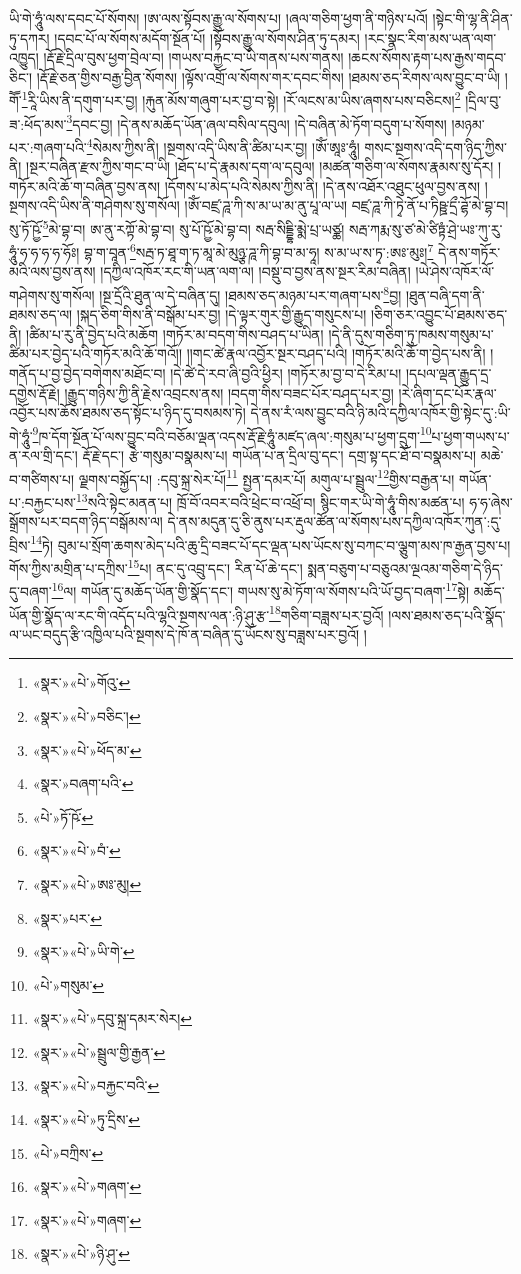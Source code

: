 ཡི་གེ་ཧཱུཾ་ལས་དབང་པོ་སོགས། །ཨ་ལས་སྟོབས་རྒྱུ་ལ་སོགས་པ། །ཞལ་གཅིག་ཕྱག་ནི་གཉིས་པའོ། །སྟེང་གི་ལྷ་ནི་ཤིན་ཏུ་དཀར། །དབང་པོ་ལ་སོགས་མདོག་སྔོན་པོ། །སྟོབས་རྒྱུ་ལ་སོགས་ཤིན་ཏུ་དམར། །རང་སྣང་རིག་མས་ཡན་ལག་འཁྱུད། །རྡོ་རྗེ་དྲིལ་བུས་ཕྱག་བྲེལ་བ། །གཡས་བརྐྱང་བ་ཡི་གནས་པས་གནས། །ཆངས་སོགས་རྟག་པས་རྒྱས་གདབ་ཅིང་། །རྡོ་རྗེ་ཅན་གྱིས་བརྒྱ་བྱིན་སོགས། །ལྟོས་འགྲོ་ལ་སོགས་གར་དབང་གིས། །ཐམས་ཅད་རིགས་ལས་བྱུང་བ་ཡི། །གཽ་\footnote{«སྣར་»«པེ་»གོའུ་}རཱི་ཡིས་ནི་དགུག་པར་བྱ། །རྐུན་མོས་གཞུག་པར་བྱ་བ་སྟེ། །རོ་ལངས་མ་ཡིས་ཞགས་པས་བཅིངས།\footnote{«སྣར་»«པེ་»བཅིང་།} །དྲིལ་བུ་ཟ་:ཕོད་མས་\footnote{«སྣར་»«པེ་»ཕོད་མ་}དབང་བྱ། །དེ་ནས་མཆོད་ཡོན་ཞལ་བསིལ་དབུལ། །དེ་བཞིན་མེ་ཏོག་བདུག་པ་སོགས། །མཉམ་པར་:གཞག་པའི་\footnote{«སྣར་»བཞག་པའི་}སེམས་ཀྱིས་ནི། །སྔགས་འདི་ཡིས་ནི་ཚིམ་པར་བྱ། །ཨོཾ་ཨཱཿ་ཧཱུཾ། གསང་སྔགས་འདི་དག་ཉིད་ཀྱིས་ནི། །སྔར་བཞིན་རྫས་ཀྱིས་གང་བ་ཡི། །ཐོད་པ་དེ་རྣམས་དག་ལ་དབུལ། །མཚན་གཅིག་ལ་སོགས་རྣམས་སུ་དོར། །གཏོར་མའི་ཆོ་ག་བཞིན་བྱས་ནས། །དོགས་པ་མེད་པའི་སེམས་ཀྱིས་ནི། །དེ་ནས་འཐོར་འཐུང་ཕུལ་བྱས་ནས། །སྔགས་འདི་ཡིས་ནི་གཤེགས་སུ་གསོལ། །ཨོཾ་བཛྲ་ཌཱ་ཀི་ས་མ་ཡ་མ་ནུ་པཱ་ལ་ཡ། བཛྲ་ཌཱ་ཀི་ཏྭེ་ནོ་པ་ཏིཥྛ་དྲྀ་ཌྷོ་མེ་བྷ་བ། སུ་ཏོ་ཥྱོ་\footnote{«པེ་»ཏོ་ཥོ་}མེ་བྷ་བ། ཨ་ནུ་རཀྟོ་མེ་བྷ་བ། སུ་པོ་ཥྱོ་མེ་བྷ་བ། སརྦ་སིདྡྷི་མྨེ་པྲ་ཡཙྪ། སརྦ་ཀརྨ་སུ་ཙ་མེ་ཙིཏྟཾ་ཤྲེ་ཡཿ་ཀུ་རུ་ཧཱུཾ་ཧ་ཧ་ཧ་ཧ་ཧོཿ། བྷ་ག་བཱན་\footnote{«སྣར་»«པེ་»བཾ་}སརྦ་ཏ་ཐཱ་ག་ཏ་མཱ་མེ་མུཉྩ་ཌཱ་ཀི་བྷ་བ་མ་ཧཱ། ས་མ་ཡ་ས་ཏྭ་:ཨཿ་མུཿ།\footnote{«སྣར་»«པེ་»ཨཿ་མུ།} དེ་ནས་གཏོར་མའི་ལས་བྱས་ནས། །དཀྱིལ་འཁོར་རང་གི་ཡན་ལག་ལ། །བསྡུ་བ་བྱས་ནས་སྔར་རིམ་བཞིན། །ཡེ་ཤེས་འཁོར་ལོ་གཤེགས་སུ་གསོལ། །སྔ་དྲོའི་ཐུན་ལ་དེ་བཞིན་དུ། །ཐམས་ཅད་མཉམ་པར་གཞག་པས་\footnote{«སྣར་»པར་}བྱ། །ཐུན་བཞི་དག་ནི་ཐམས་ཅད་ལ། །སྐད་ཅིག་གིས་ནི་བསྒོམ་པར་བྱ། །དེ་ལྟར་གུར་གྱི་རྒྱུད་གསུངས་པ། །ཅིག་ཅར་འབྱུང་པོ་ཐམས་ཅད་ནི། །ཚིམ་པ་རུ་ནི་བྱེད་པའི་མཆོག །གཏོར་མ་བདག་གིས་བཤད་པ་ཡིན། །དེ་ནི་དུས་གཅིག་ཏུ་ཁམས་གསུམ་པ་ཚིམ་པར་བྱེད་པའི་གཏོར་མའི་ཆོ་གའོ།། །།གང་ཚེ་རྣལ་འབྱོར་སྔར་བཤད་པའི། །གཏོར་མའི་ཆོ་ག་བྱེད་པས་ནི། །གནོད་པ་བྱ་བྱེད་བགེགས་མཐོང་བ། །དེ་ཚེ་དེ་རབ་ཞི་བྱའི་ཕྱིར། །གཏོར་མ་བྱ་བ་དེ་རིམ་པ། །དཔལ་ལྡན་རྒྱུད་དྲ་དགྱེས་རྡོ་རྗེ། །རྒྱུད་གཉིས་ཀྱི་ནི་རྗེས་འབྲངས་ནས། །བདག་གིས་བཟང་པོར་བཤད་པར་བྱ། །རེ་ཞིག་དང་པོར་རྣལ་འབྱོར་པས་ཆོས་ཐམས་ཅད་སྟོང་པ་ཉིད་དུ་བསམས་ཏེ། དེ་ནས་རཾ་ལས་བྱུང་བའི་ཉི་མའི་དཀྱིལ་འཁོར་གྱི་སྟེང་དུ་:ཡི་གེ་ཧཱུཾ་\footnote{«སྣར་»«པེ་»ཡི་གེ་}ཁ་དོག་སྔོན་པོ་ལས་བྱུང་བའི་བཅོམ་ལྡན་འདས་རྡོ་རྗེ་ཧཱུཾ་མཛད་ཞལ་:གསུམ་པ་ཕྱག་དྲུག་\footnote{«པེ་»གསུམ་}པ་ཕྱག་གཡས་པ་ན་རལ་གྲི་དང་། རྡོ་རྗེ་དང་། རྩེ་གསུམ་བསྣམས་པ། གཡོན་པ་ན་དྲིལ་བུ་དང་། དགྲ་སྟ་དང་ཐོ་བ་བསྣམས་པ། མཆེ་བ་གཙིགས་པ། ལྗགས་བསྐྱོད་པ། :དབུ་སྐྲ་སེར་པོ།\footnote{«སྣར་»«པེ་»དབུ་སྐྲ་དམར་སེར།} སྤྱན་དམར་པོ། མགུལ་པ་སྦྲུལ་\footnote{«སྣར་»«པེ་»སྦྲུལ་གྱི་རྒྱན་}གྱིས་བརྒྱན་པ། གཡོན་པ་:བརྐྱང་པས་\footnote{«སྣར་»«པེ་»བརྐྱང་བའི་}སའི་སྟེང་མནན་པ། ཁྲོ་བོ་འབར་བའི་ཕྲེང་བ་འཕྲོ་བ། སྙིང་གར་ཡི་གེ་ཧཱུཾ་གིས་མཚན་པ། ཧ་ཧ་ཞེས་སྒྲོགས་པར་བདག་ཉིད་བསྒོམས་ལ། དེ་ནས་མདུན་དུ་ཅི་ནུས་པར་རྡུལ་ཚོན་ལ་སོགས་པས་དཀྱིལ་འཁོར་ཀུན་:དུ་བྲིས་\footnote{«སྣར་»«པེ་»ཏུ་དྲིས་}ཏེ། བུམ་པ་སྲོག་ཆགས་མེད་པའི་ཆུ་དྲི་བཟང་པོ་དང་ལྡན་པས་ཡོངས་སུ་བཀང་བ་ལྕུག་མས་ཁ་རྒྱན་བྱས་པ། གོས་ཀྱིས་མགྲིན་པ་དཀྲིས་\footnote{«པེ་»བཀྲིས་}པ། ནང་དུ་འབྲུ་དང་། རིན་པོ་ཆེ་དང་། སྨན་བཅུག་པ་བཅུའམ་ལྔའམ་གཅིག་དེ་ཉིད་དུ་བཞག་\footnote{«སྣར་»«པེ་»གཞག་}ལ། གཡོན་དུ་མཆོད་ཡོན་གྱི་སྣོད་དང་། གཡས་སུ་མེ་ཏོག་ལ་སོགས་པའི་ཡོ་བྱད་བཞག་\footnote{«སྣར་»«པེ་»གཞག་}སྟེ། མཆོད་ཡོན་གྱི་སྣོད་ལ་རང་གི་འདོད་པའི་ལྷའི་སྔགས་ལན་:ཉི་ཤུ་རྩ་\footnote{«སྣར་»«པེ་»ཉི་ཤུ་}གཅིག་བཟླས་པར་བྱའོ། །ལས་ཐམས་ཅད་པའི་སྣོད་ལ་ཡང་བདུད་རྩི་འཁྱིལ་པའི་སྔགས་དེ་ཁོ་ན་བཞིན་དུ་ཡོངས་སུ་བཟླས་པར་བྱའོ། །
